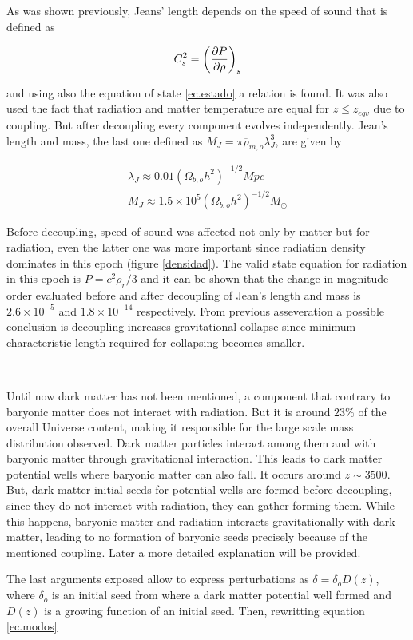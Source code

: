 As was shown previously, Jeans' length depends on the speed of sound
that is defined as 

\[
C_s^2 = \left( \frac{\partial P}{\partial \rho} \right)_s
\]

and using also the equation of state \ref{ec.estado} a relation 
is found. It was also used the fact that radiation and matter 
temperature are equal for $z \leq z_{eqv}$ due to coupling. 
But after decoupling every component evolves independently. 
Jean's length and mass, the last one defined as $M_J =  \pi\overline{\rho}_{m,o}\lambda_J^3 $,
are given by

\begin{eqnarray}
\lambda_J \approx 0.01(\Omega_{b,o}h^2)^{-1/2}Mpc\\
M_J \approx 1.5\times 10^5 (\Omega_{b,o}h^2)^{-1/2}M_{\odot}
\end{eqnarray}

Before decoupling, speed of sound was affected not only 
by matter but for radiation, even the latter one was more
important since radiation density dominates in this epoch
(figure \ref{densidad}). 
The valid state equation for radiation in this epoch is
$P = c^2\rho_r/3$ and it can be shown that the change 
in magnitude order evaluated before and after decoupling
of Jean's length and mass is $2.6\times 10^{-5}$ and $1.8\times 10^{-14}$
respectively. From previous asseveration a possible conclusion is
decoupling increases gravitational collapse since  minimum characteristic length
required for collapsing becomes smaller. 

\

Until now dark matter has not been mentioned, a component that contrary
to baryonic matter does not interact with radiation. But it is around
$23\%$ of the overall Universe content, making it responsible for the 
large scale mass distribution observed. Dark matter particles interact
among them and with baryonic matter through gravitational interaction.
This leads to dark matter potential wells where baryonic matter can also fall.  
It occurs around $z \sim 3500$. But, dark matter initial seeds for potential 
wells are formed before decoupling, since they do not interact with radiation,
they can gather forming them. While this happens, baryonic matter and radiation 
interacts gravitationally with dark matter, leading to no formation of 
baryonic seeds precisely because of the mentioned coupling. Later a more detailed 
explanation will be provided. 

The last arguments exposed allow to express perturbations as $\delta = \delta_oD(z)$,
where $\delta_o$ is an initial seed from where a dark matter potential well formed
and $D(z)$ is a growing function of an initial seed.
Then, rewritting equation \ref{ec.modos}  

